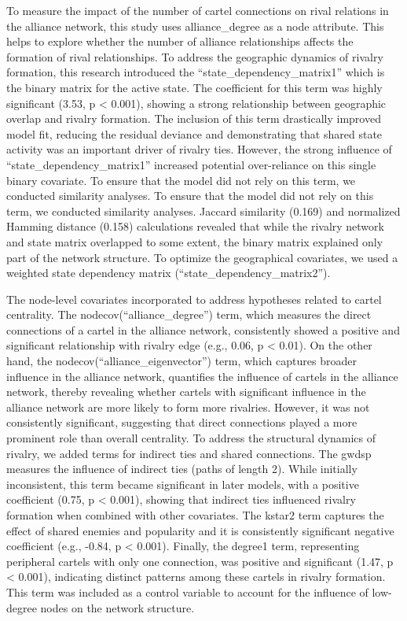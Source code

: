 \documentclass[
]{article}
\begin{document}
To measure the impact of the number of cartel connections on rival
relations in the alliance network, this study uses alliance\_degree as a
node attribute. This helps to explore whether the number of alliance
relationships affects the formation of rival relationships. To address
the geographic dynamics of rivalry formation, this research introduced
the ``state\_dependency\_matrix1'' which is the binary matrix for the
active state. The coefficient for this term was highly significant
(3.53, p \textless{} 0.001), showing a strong relationship between
geographic overlap and rivalry formation. The inclusion of this term
drastically improved model fit, reducing the residual deviance and
demonstrating that shared state activity was an important driver of
rivalry ties. However, the strong influence of
``state\_dependency\_matrix1'' increased potential over-reliance on this
single binary covariate. To ensure that the model did not rely on this
term, we conducted similarity analyses. To ensure that the model did not
rely on this term, we conducted similarity analyses. Jaccard similarity
(0.169) and normalized Hamming distance (0.158) calculations revealed
that while the rivalry network and state matrix overlapped to some
extent, the binary matrix explained only part of the network structure.
To optimize the geographical covariates, we used a weighted state
dependency matrix (``state\_dependency\_matrix2'').

The node-level covariates incorporated to address hypotheses related to
cartel centrality. The nodecov(``alliance\_degree'') term, which
measures the direct connections of a cartel in the alliance network,
consistently showed a positive and significant relationship with rivalry
edge (e.g., 0.06, p \textless{} 0.01). On the other hand, the
nodecov(``alliance\_eigenvector'') term, which captures broader
influence in the alliance network, quantifies the influence of cartels
in the alliance network, thereby revealing whether cartels with
significant influence in the alliance network are more likely to form
more rivalries. However, it was not consistently significant, suggesting
that direct connections played a more prominent role than overall
centrality. To address the structural dynamics of rivalry, we added
terms for indirect ties and shared connections. The gwdsp measures the
influence of indirect ties (paths of length 2). While initially
inconsistent, this term became significant in later models, with a
positive coefficient (0.75, p \textless{} 0.001), showing that indirect
ties influenced rivalry formation when combined with other covariates.
The kstar2 term captures the effect of shared enemies and popularity and
it is consistently significant negative coefficient (e.g., -0.84, p
\textless{} 0.001). Finally, the degree1 term, representing peripheral
cartels with only one connection, was positive and significant (1.47, p
\textless{} 0.001), indicating distinct patterns among these cartels in
rivalry formation. This term was included as a control variable to
account for the influence of low-degree nodes on the network structure.
\end{document}
